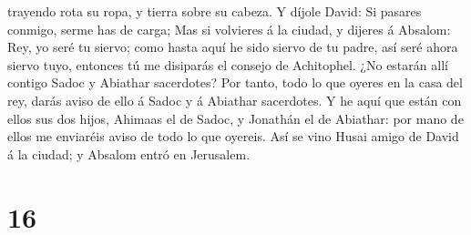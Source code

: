 trayendo rota su ropa, y tierra sobre su cabeza.  Y díjole
David: Si pasares conmigo, serme has de carga;  Mas si
volvieres á la ciudad, y dijeres á Absalom: Rey, yo seré tu siervo; como
hasta aquí he sido siervo de tu padre, así seré ahora siervo tuyo,
entonces tú me disiparás el consejo de Achitophel.  ¿No
estarán allí contigo Sadoc y Abiathar sacerdotes? Por tanto, todo lo que
oyeres en la casa del rey, darás aviso de ello á Sadoc y á Abiathar
sacerdotes.  Y he aquí que están con ellos sus dos hijos,
Ahimaas el de Sadoc, y Jonathán el de Abiathar: por mano de ellos me
enviaréis aviso de todo lo que oyereis.  Así se vino Husai
amigo de David á la ciudad; y Absalom entró en Jerusalem.

\hypertarget{section-15}{%
\section{16}\label{section-15}}

